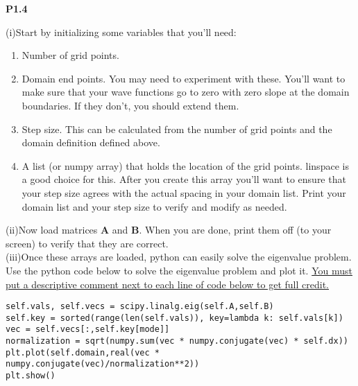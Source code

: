 \begin{minipage}{0.9\linewidth}
\noindent\textbf{P1.4} 

(i)Start by initializing some variables that you'll need:
\begin{enumerate}
\item  Number of grid points.
\item  Domain end points. You may need to experiment with these.  You'll want to make sure that your wave functions go to zero with zero slope at the domain boundaries. If they don't, you should extend them.
\item  Step size.  This can be calculated from the number of grid points and the domain definition defined above.
\item A list (or numpy array) that holds the location of the grid points.  linspace is a good choice for this.  After you create this array you'll want to ensure that your step size agrees with the actual spacing in your domain list.  Print your domain list and your step size to verify and modify as needed. 
\end{enumerate}


(ii)Now load matrices $\boldsymbol{A}$ and  $\boldsymbol{B}$.  When you are done, print them off (to your screen) to verify that they are correct. \\


(iii)Once these arrays are loaded, python can easily solve the eigenvalue
problem. Use the python code below to solve the eigenvalue problem and
plot it. \underline{You must put a descriptive comment next to each line of code
below to get full credit.}
\begin{verbatim}
self.vals, self.vecs = scipy.linalg.eig(self.A,self.B)
self.key = sorted(range(len(self.vals)), key=lambda k: self.vals[k])
vec = self.vecs[:,self.key[mode]]
normalization = sqrt(numpy.sum(vec * numpy.conjugate(vec) * self.dx))
plt.plot(self.domain,real(vec * numpy.conjugate(vec)/normalization**2))
plt.show()
\end{verbatim}
\end{minipage}

